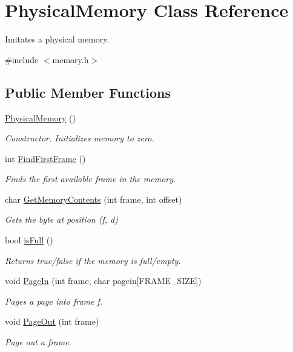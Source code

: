 \hypertarget{classPhysicalMemory}{}\section{Physical\+Memory Class Reference}
\label{classPhysicalMemory}


Imitates a physical memory.  




{\ttfamily \#include $<$memory.\+h$>$}

\subsection*{Public Member Functions}
\begin{DoxyCompactItemize}
\item 
\hyperlink{classPhysicalMemory_ad7fefaba61061c7339164836c6c02eaa}{Physical\+Memory} ()\hypertarget{classPhysicalMemory_ad7fefaba61061c7339164836c6c02eaa}{}\label{classPhysicalMemory_ad7fefaba61061c7339164836c6c02eaa}

\begin{DoxyCompactList}\small\item\em Constructor. Initializes memory to zero. \end{DoxyCompactList}\item 
int \hyperlink{classPhysicalMemory_a41ba2824ae9550b68036536d94ae8b32}{Find\+First\+Frame} ()
\begin{DoxyCompactList}\small\item\em Finds the first available frame in the memory. \end{DoxyCompactList}\item 
char \hyperlink{classPhysicalMemory_a2d6b5c45f2377838a76e58b2c083610a}{Get\+Memory\+Contents} (int frame, int offset)
\begin{DoxyCompactList}\small\item\em Gets the byte at position (f, d) \end{DoxyCompactList}\item 
bool \hyperlink{classPhysicalMemory_acde26e332e20349baa6c409b88635258}{is\+Full} ()
\begin{DoxyCompactList}\small\item\em Returns true/false if the memory is full/empty. \end{DoxyCompactList}\item 
void \hyperlink{classPhysicalMemory_a70cb4ae5b23f04cb347ac93cc9fc1028}{Page\+In} (int frame, char pagein\mbox{[}F\+R\+A\+M\+E\+\_\+\+S\+I\+ZE\mbox{]})
\begin{DoxyCompactList}\small\item\em Pages a page into frame f. \end{DoxyCompactList}\item 
void \hyperlink{classPhysicalMemory_a6e1cf83f35ab25e879630783ebaecff3}{Page\+Out} (int frame)
\begin{DoxyCompactList}\small\item\em Page out a frame. \end{DoxyCompactList}\end{DoxyCompactItemize}


